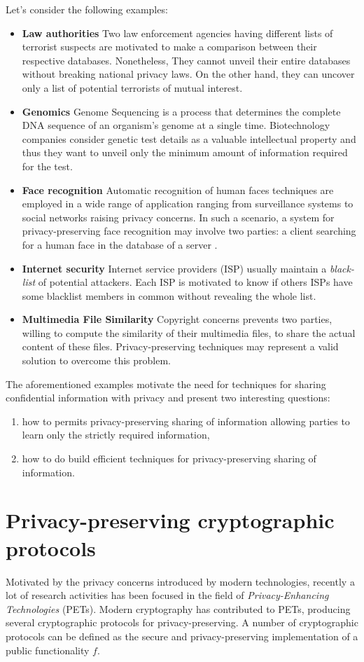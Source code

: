 \documentclass[dvips,12pt]{article}
\begin{document}
Let's consider the following examples:
\begin{itemize}
\item \textbf{Law authorities} Two law enforcement agencies having different lists of terrorist suspects are motivated to make a comparison between their respective databases. Nonetheless, They cannot unveil their entire databases without breaking national privacy laws. On the other hand, they can uncover only a list of potential terrorists of mutual interest.
\item \textbf{Genomics} Genome Sequencing is a process that determines the complete DNA sequence of an organism's genome at a single time. Biotechnology companies consider genetic test details as a valuable intellectual property and thus they want to unveil only the minimum amount of information required for the test.
\item \textbf{Face recognition} Automatic recognition of human faces techniques are employed in a wide range of application ranging from surveillance systems to social networks raising privacy concerns. In such a scenario, a system for privacy-preserving face recognition may involve two parties: a client searching for a human face in the database of a server .
\item \textbf{Internet security} Internet service providers (ISP) usually maintain a \emph{black-list} of potential attackers. Each ISP is motivated to know if others ISPs have some blacklist members in common without revealing the whole list.
\item \textbf{Multimedia File Similarity} Copyright concerns prevents two parties, willing to compute the similarity of their multimedia files, to share the actual content of these files. Privacy-preserving techniques may represent a valid solution to overcome this problem.
\end{itemize} 

The aforementioned examples motivate the need for techniques for sharing confidential information with privacy and present two interesting questions: 
\begin{enumerate}
\item how to permits privacy-preserving sharing of information allowing parties to learn only the strictly required information, 
\item how to do build efficient techniques for privacy-preserving sharing of information.
\end{enumerate} 


\section{Privacy-preserving cryptographic protocols}
Motivated by the privacy concerns introduced by modern technologies, recently a lot of research activities has been focused in the field of \emph{Privacy-Enhancing Technologies} (PETs).
Modern cryptography has contributed to PETs, producing several cryptographic protocols for privacy-preserving. 
A number of cryptographic protocols can be defined as the secure and privacy-preserving implementation of a public functionality $f$.
\end{document}
